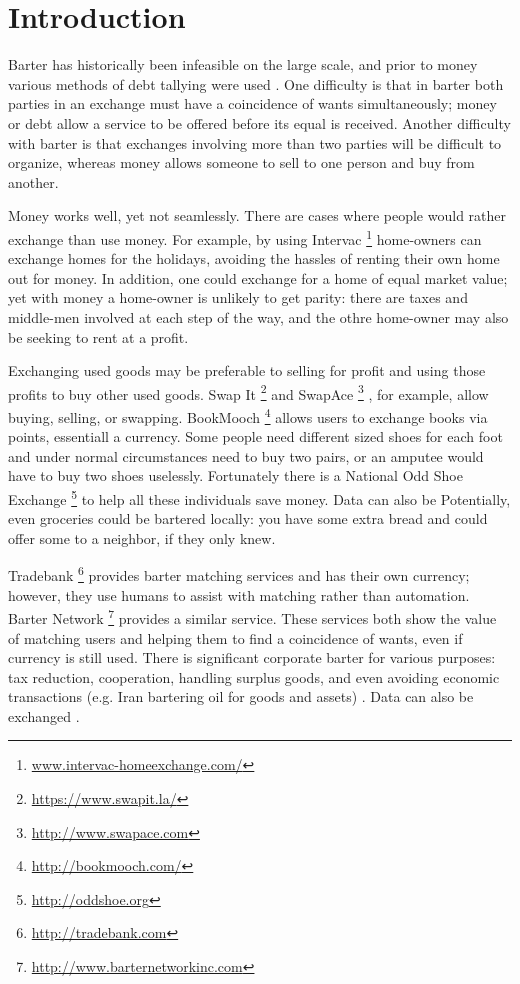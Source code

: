 \documentclass[main.tex]{subfiles}
\begin{document}
\section{Introduction}
Barter has historically been infeasible on the large scale, and prior to money various methods of debt tallying were used \cite{Gra1}. One difficulty is that in barter both parties in an exchange must have a coincidence of wants simultaneously; money or debt allow a service to be offered before its equal is received. Another difficulty with barter is that exchanges involving more than two parties will be difficult to organize, whereas money allows someone to sell to one person and buy from another.

Money works well, yet not seamlessly. There are cases where people would rather exchange than use money. For example, by using Intervac \footnote{\url{www.intervac-homeexchange.com/}} \cite{Abr1} home-owners can exchange homes for the holidays, avoiding the hassles of renting their own home out for money. In addition, one could exchange for a home of equal market value; yet with money a home-owner is unlikely to get parity: there are taxes and middle-men involved at each step of the way, and the othre home-owner may also be seeking to rent at a profit.

Exchanging used goods may be preferable to selling for profit and using those profits to buy other used goods. Swap It \footnote{\url{https://www.swapit.la/}} \cite{Abr1} and SwapAce \footnote{\url{http://www.swapace.com}} \cite{Cab0}, for example, allow buying, selling, or swapping. BookMooch \footnote{\url{http://bookmooch.com/}} allows users to exchange books via points, essentiall a currency. Some people need different sized shoes for each foot and under normal circumstances need to buy two pairs, or an amputee would have to buy two shoes uselessly. Fortunately there is a National Odd Shoe Exchange \footnote{\url{http://oddshoe.org}} \cite{Abr1} to help all these individuals save money. Data can also be  Potentially, even groceries could be bartered locally: you have some extra bread and could offer some to a neighbor, if they only knew.

Tradebank \footnote{\url{http://tradebank.com}} provides barter matching services and has their own currency; however, they use humans to assist with matching rather than automation. Barter Network \footnote{\url{http://www.barternetworkinc.com}} provides a similar service. These services both show the value of matching users and helping them to find a coincidence of wants, even if currency is still used. There is significant corporate barter for various purposes: tax reduction, cooperation, handling surplus goods, and even avoiding economic transactions (e.g. Iran bartering oil for goods and assets) \cite{art:str}. Data can also be exchanged \cite{art:blo}.
\end{document}
